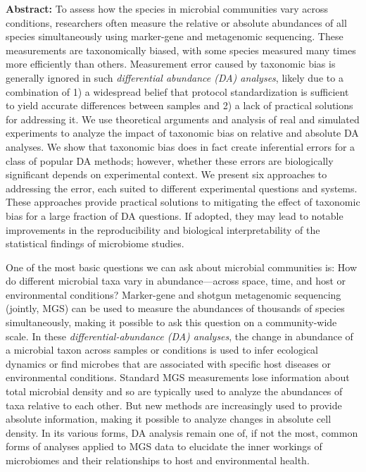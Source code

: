 \documentclass[
]{article}
\begin{document}
\leavevmode{}%
\textbf{Abstract:}
To assess how the species in microbial communities vary across conditions, researchers often measure the relative or absolute abundances of all species simultaneously using marker-gene and metagenomic sequencing.
These measurements are taxonomically biased, with some species measured many times more efficiently than others.
Measurement error caused by taxonomic bias is generally ignored in such \emph{differential abundance (DA) analyses}, likely due to a combination of 1) a widespread belief that protocol standardization is sufficient to yield accurate differences between samples and 2) a lack of practical solutions for addressing it.
We use theoretical arguments and analysis of real and simulated experiments to analyze the impact of taxonomic bias on relative and absolute DA analyses.
We show that taxonomic bias does in fact create inferential errors for a class of popular DA methods; however, whether these errors are biologically significant depends on experimental context.
We present six approaches to addressing the error, each suited to different experimental questions and systems.
These approaches provide practical solutions to mitigating the effect of taxonomic bias for a large fraction of DA questions.
If adopted, they may lead to notable improvements in the reproducibility and biological interpretability of the statistical findings of microbiome studies.

One of the most basic questions we can ask about microbial communities is: How do different microbial taxa vary in abundance---across space, time, and host or environmental conditions?
Marker-gene and shotgun metagenomic sequencing (jointly, MGS) can be used to measure the abundances of thousands of species simultaneously, making it possible to ask this question on a community-wide scale.
In these \emph{differential-abundance (DA) analyses}, the change in abundance of a microbial taxon across samples or conditions is used to infer ecological dynamics or find microbes that are associated with specific host diseases or environmental conditions.
Standard MGS measurements lose information about total microbial density and so are typically used to analyze the abundances of taxa relative to each other.
But new methods are increasingly used to provide absolute information, making it possible to analyze changes in absolute cell density.
In its various forms, DA analysis remain one of, if not the most, common forms of analyses applied to MGS data to elucidate the inner workings of microbiomes and their relationships to host and environmental health.
\end{document}
